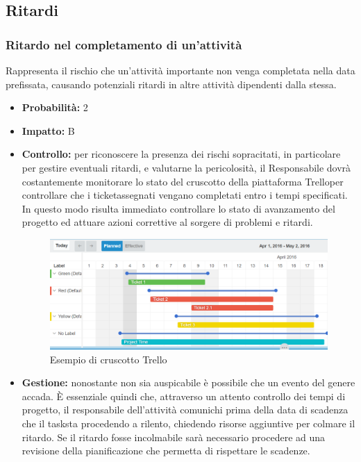 \documentclass[a4paper,11pt]{article}
\begin{document}
	\subsection{Ritardi}
		\subsubsection{Ritardo nel completamento di un'attività}
		Rappresenta il rischio che un'attività importante non venga completata nella data prefissata, causando potenziali ritardi in altre attività dipendenti dalla stessa.
		\begin{itemize}
		\item \textbf{Probabilità:} 2
		\item \textbf{Impatto:} B
		\item \textbf{Controllo:} per riconoscere la presenza dei rischi sopracitati, in particolare per gestire eventuali ritardi, e valutarne la pericolosità, il Responsabile dovrà costantemente monitorare lo stato del cruscotto della piattaforma Trello\addglos per controllare che i ticket\addglos assegnati vengano completati entro i tempi specificati. In questo modo risulta immediato controllare lo stato di avanzamento del progetto ed attuare azioni correttive al sorgere di problemi e ritardi.
		\begin{figure}[h!]
		\begin{center}
			\hspace{1cm}
			\includegraphics[scale=0.35]{../Images/ticketing-example.png}
			\caption{Esempio di cruscotto Trello}	
		\end{center}
		\end{figure}	
		\item \textbf{Gestione:} nonostante non sia auspicabile è possibile che un evento del genere accada. È essenziale quindi che, attraverso un attento controllo dei tempi di progetto, il responsabile dell'attività comunichi prima della data di scadenza che  il task\addglos sta procedendo a rilento, chiedendo risorse aggiuntive per colmare il ritardo. Se il ritardo fosse incolmabile sarà necessario procedere ad una revisione della pianificazione che permetta di rispettare le scadenze.

\end{itemize}
\end{document}
